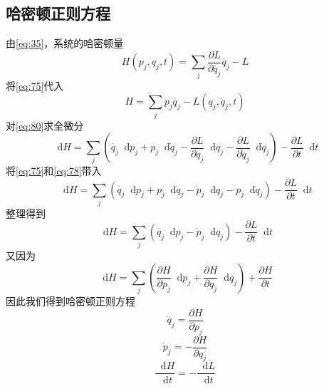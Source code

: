 \documentclass{article}
\newcommand*{\dif}{\mathop{}\!\mathrm{d}}
\begin{document}
\subsection{哈密顿正则方程}

由\ref{eq:35}，系统的哈密顿量
\begin{equation}
  \label{eq:79}
  H \left( p_{j},q_{j},t \right) = \sum\limits_{j} \frac{\partial L}{\partial \dot{q_{j}}} \dot{q_{j}} -L
\end{equation}
将\ref{eq:75}代入
\begin{equation}
  \label{eq:80}
  H = \sum\limits_{j} p_{j} \dot{q_{j}} -L \left( q_{j},\dot{q}_{j},t \right)
\end{equation}
对\ref{eq:80}求全微分
\begin{equation}
  \label{eq:81}
  \dif H  = \sum\limits_{j} \left(  \dot{q_{j}} \dif p_{j} + p_{j} \dif \dot{q}_{j} - \dfrac{\partial L}{\partial q_{j}} \dif q_{j} - \dfrac{\partial L}{\partial \dot{q}_{j}} \dif \dot{q}_j \right) - \dfrac{\partial L}{\partial t} \dif t
\end{equation}
将\ref{eq:75}和\ref{eq:78}带入
\begin{equation}
  \label{eq:82}
  \dif H = \sum\limits_{j} \left(  \dot{q_{j}} \dif p_{j} + p_{j} \dif \dot{q}_{j} - \dot{p}_{j} \dif q_{j} - p_{j} \dif \dot{q}_j \right) - \dfrac{\partial L}{\partial t} \dif t
\end{equation}
整理得到
\begin{equation}
  \label{eq:83}
  \dif H = \sum\limits_{j} \left(  \dot{q_{j}} \dif p_{j} - \dot{p}_{j} \dif q_{j} \right) - \dfrac{\partial L}{\partial t} \dif t
\end{equation}
又因为
\begin{equation}
  \label{eq:84}
  \dif H = \sum\limits_{j}\left( \dfrac{\partial H}{\partial p_{j}} \dif p_{j} + \dfrac{\partial H}{\partial q_{j}} \dif q_{j} \right) + \dfrac{\partial H}{\partial t} 
\end{equation}
因此我们得到哈密顿正则方程
\begin{equation}
  \label{eq:85}
  \dot{q}_{j} = \dfrac{\partial H}{\partial p_{j}}
\end{equation}
\begin{equation}
  \label{eq:86}
  \dot{p}_{j} = -\dfrac{\partial H}{\partial q_{j}}
\end{equation}
\begin{equation}
  \label{eq:87}
  \dfrac{\dif H}{\dif t} = - \dfrac{\dif L}{\dif t}
\end{equation}
\end{document}
